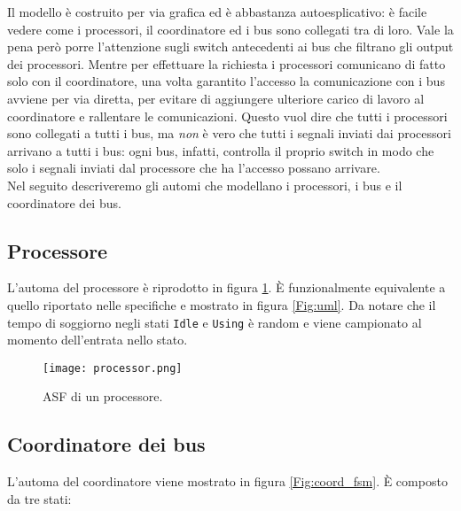 \noindent
Il modello è costruito per via grafica ed è abbastanza autoesplicativo: è facile vedere come i processori, il coordinatore ed i bus sono collegati tra di loro. Vale la pena però porre l'attenzione sugli switch antecedenti ai bus che filtrano gli output dei processori. Mentre per effettuare la richiesta i processori comunicano di fatto solo con il coordinatore, una volta garantito l'accesso la comunicazione con i bus avviene per via diretta, per evitare di aggiungere ulteriore carico di lavoro al coordinatore e rallentare le comunicazioni. Questo vuol dire che tutti i processori sono collegati a tutti i bus, ma \textit{non} è vero che tutti i segnali inviati dai processori arrivano a tutti i bus: ogni bus, infatti, controlla il proprio switch in modo che solo i segnali inviati dal processore che ha l'accesso possano arrivare.\\

Nel seguito descriveremo gli automi che modellano i processori, i bus e il coordinatore dei bus.

\subsection{Processore} 
L'automa del processore è riprodotto in figura \ref{Fig:proc_fsm}. È funzionalmente equivalente a quello riportato nelle specifiche e mostrato in figura \ref{Fig:uml}. Da notare che il tempo di soggiorno negli stati \texttt{Idle} e \texttt{Using} è random e viene campionato al momento dell'entrata nello stato.

\begin{figure}[!hb]
\centerline{\texttt{[image: processor.png]}}
\caption{ASF di un processore.}
\label{Fig:proc_fsm}
\vspace{-2cm}
\end{figure}

\subsection{Coordinatore dei bus} 
L'automa del coordinatore viene mostrato in figura \ref{Fig:coord_fsm}. È composto da tre stati:

